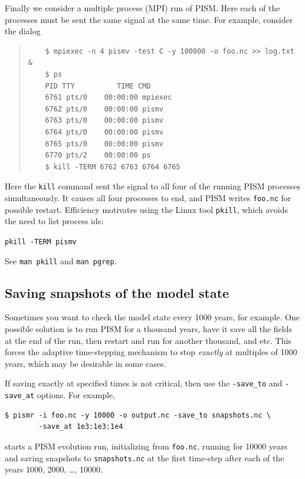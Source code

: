 \documentclass[11pt,final]{amsart}
\begin{document}
\smallskip

Finally we consider a multiple process (MPI) run of PISM.  Here each of the processes must be sent the same signal at the same time.  For example, consider the dialog
\begin{quote}
\begin{verbatim}
	$ mpiexec -n 4 pismv -test C -y 100000 -o foo.nc >> log.txt &
	$ ps
	PID TTY          TIME CMD
	6761 pts/0    00:00:00 mpiexec
	6762 pts/0    00:00:00 pismv
	6763 pts/0    00:00:00 pismv
	6764 pts/0    00:00:00 pismv
	6765 pts/0    00:00:00 pismv
	6770 pts/2    00:00:00 ps
	$ kill -TERM 6762 6763 6764 6765
\end{verbatim}
\end{quote}
Here the \verb|kill| command sent the signal to all four of the running PISM processes simultaneously.  It causes all four processes to end, and PISM writes \verb|foo.nc| for possible restart.  Efficiency motivates using the Linux tool \verb|pkill|, which avoids the need to list process ids:

  \verb|pkill -TERM pismv|

\noindent See \verb|man pkill| and \verb|man pgrep|.



\subsection{Saving snapshots of the model state}
\label{sec:snapshots}  Sometimes you want to check the model state every 1000 years, for example.  One possible solution is to run PISM for a thousand years, have it save all the fields at the end of the run, then restart and run for another thousand, and etc.  This forces the adaptive time-stepping mechanism to stop \emph{exactly} at multiples of 1000 years, which may be desirable in some cases.

If saving exactly at specified times is not critical, then use the \verb|-save_to| and \verb|-save_at| options.  For example,
\begin{verbatim}
$ pismr -i foo.nc -y 10000 -o output.nc -save_to snapshots.nc \
        -save_at 1e3:1e3:1e4
\end{verbatim}
starts a PISM evolution run, initializing from \verb|foo.nc|, running for
10000 years and saving snapshots to \verb|snapshots.nc| at the first time-step
after each of the years 1000, 2000, \dots, 10000.
\end{document}
